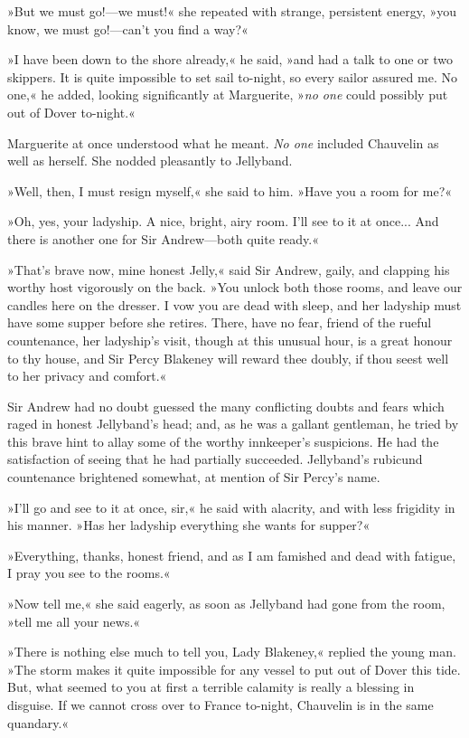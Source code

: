 »But we must go!\allowbreak---\allowbreak we must!« she repeated with strange, persistent energy, »you know, we must go!\allowbreak---\allowbreak can't you find a way?«

»I have been down to the shore already,« he said, »and had a talk to one or two skippers. It is quite impossible to set sail to-night, so every sailor assured me. No one,« he added, looking significantly at Marguerite, »\textit{no one} could possibly put out of Dover to-night.«

Marguerite at once understood what he meant. \textit{No one} included Chauvelin as well as herself. She nodded pleasantly to Jellyband.

»Well, then, I must resign myself,« she said to him. »Have you a room for me?«

»Oh, yes, your ladyship. A nice, bright, airy room. I'll see to it at once... And there is another one for Sir Andrew\allowbreak---\allowbreak both quite ready.«

»That's brave now, mine honest Jelly,« said Sir Andrew, gaily, and clapping his worthy host vigorously on the back. »You unlock both those rooms, and leave our candles here on the dresser. I vow you are dead with sleep, and her ladyship must have some supper before she retires. There, have no fear, friend of the rueful countenance, her ladyship's visit, though at this unusual hour, is a great honour to thy house, and Sir Percy Blakeney will reward thee doubly, if thou seest well to her privacy and comfort.«

Sir Andrew had no doubt guessed the many conflicting doubts and fears which raged in honest Jellyband's head; and, as he was a gallant gentleman, he tried by this brave hint to allay some of the worthy innkeeper's suspicions. He had the satisfaction of seeing that he had partially succeeded. Jellyband's rubicund countenance brightened somewhat, at mention of Sir Percy's name.

»I'll go and see to it at once, sir,« he said with alacrity, and with less frigidity in his manner. »Has her ladyship everything she wants for supper?«

»Everything, thanks, honest friend, and as I am famished and dead with fatigue, I pray you see to the rooms.«

»Now tell me,« she said eagerly, as soon as Jellyband had gone from the room, »tell me all your news.«

»There is nothing else much to tell you, Lady Blakeney,« replied the young man. »The storm makes it quite impossible for any vessel to put out of Dover this tide. But, what seemed to you at first a terrible calamity is really a blessing in disguise. If we cannot cross over to France to-night, Chauvelin is in the same quandary.«

